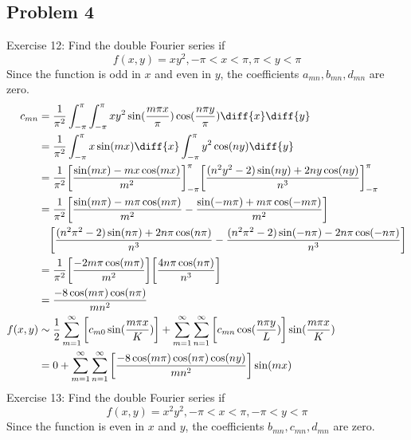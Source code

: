 \documentclass{math}
\begin{document}
\subsection*{Problem 4}
Exercise 12: Find the double Fourier series if
\[ f(x,y) = xy^2, -\pi<x<\pi, \pi<y<\pi \]
Since the function is odd in \( x \) and even in \( y \), the coefficients
\( a_{mn}, b_{mn}, d_{mn} \) are zero.
\begin{align*}
  c_{mn} &= \frac{1}{\pi^2}\int_{-\pi}^{\pi}\int_{-\pi}^{\pi}xy^2
    \sin(\frac{m\pi x}{\pi})\cos(\frac{n\pi y}{\pi})\diff{x}\diff{y} \\
  &= \frac{1}{\pi^2}\int_{-\pi}^{\pi}x\sin(mx)\diff{x}
    \int_{-\pi}^{\pi}y^2\cos(ny)\diff{y} \\
  &= \frac{1}{\pi^2}
    \bigg[\frac{\sin(mx)-mx\cos(mx)}{m^2}\bigg]_{-\pi}^{\pi}
    \bigg[\frac{(n^2y^2-2)\sin(ny)+2ny\cos(ny)}{n^3}\bigg]_{-\pi}^{\pi} \\
  &= \frac{1}{\pi^2}
    \bigg[
      \frac{\sin(m\pi)-m\pi\cos(m\pi)}{m^2}-
      \frac{\sin(-m\pi)+m\pi\cos(-m\pi)}{m^2}
    \bigg] \\
  &\quad \bigg[
    \frac{(n^2\pi^2-2)\sin(n\pi)+2n\pi\cos(n\pi)}{n^3}-
    \frac{(n^2\pi^2-2)\sin(-n\pi)-2n\pi\cos(-n\pi)}{n^3}
  \bigg] \\
  &= \frac{1}{\pi^2}\bigg[\frac{-2m\pi\cos(m\pi)}{m^2}\bigg]
    \bigg[\frac{4n\pi\cos(n\pi)}{n^3}\bigg] \\
  &= \frac{-8\cos(m\pi)\cos(n\pi)}{mn^2} \\
  f(x,y) &\sim \frac{1}{2}\sum_{m=1}^{\infty}
    \bigg[c_{m0}\sin(\frac{m\pi x}{K})\bigg]+
    \sum_{m=1}^{\infty}\sum_{n=1}^{\infty}
    \bigg[c_{mn}\cos(\frac{n\pi y}{L})\bigg]\sin(\frac{m\pi x}{K}) \\
  &= 0+\sum_{m=1}^{\infty}\sum_{n=1}^{\infty}
    \bigg[\frac{-8\cos(m\pi)\cos(n\pi)\cos(ny)}{mn^2}
    \bigg]\sin(mx)
\end{align*}
Exercise 13: Find the double Fourier series if
\[ f(x,y) = x^2y^2, -\pi<x<\pi, -\pi<y<\pi \]
Since the function is even in \( x \) and \( y \), the coefficients
\( b_{mn}, c_{mn}, d_{mn} \) are zero.
\end{document}
